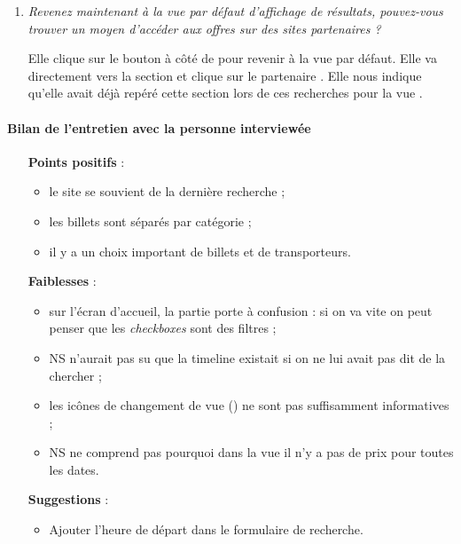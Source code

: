\begin{enumerate}
\item \textit{Revenez maintenant \`{a} la vue par d\'{e}faut d'affichage de r\'{e}sultats, pouvez-vous trouver un moyen d'acc\'{e}der aux offres sur des sites partenaires ?}

Elle clique sur le bouton \`{a} c\^{o}t\'{e} de  pour revenir \`{a} la vue par d\'{e}faut.
Elle va directement vers la section  et clique sur le partenaire .
Elle nous indique qu'elle avait d\'{e}j\`{a} rep\'{e}r\'{e} cette section lors de ces recherches pour la vue .


\end{enumerate}

\paragraph{Bilan de l'entretien avec la personne interview\'{e}e}

\begin{itemize}
  \item [\textbf{Points positifs}] :
      \begin{itemize}
      	\item le site se souvient de la derni\`{e}re recherche ;
        \item les billets sont s\'{e}par\'{e}s par cat\'{e}gorie ;
        \item il y a un choix important de billets et de transporteurs.
      \end{itemize}
      
  \item [\textbf{Faiblesses}] :
      \begin{itemize}
      	\item sur l'\'{e}cran d'accueil, la partie  porte \`{a} confusion : si on va vite on peut penser que les \textit{checkboxes} sont des filtres ;
      	\item NS n'aurait pas su que la timeline existait si on ne lui avait pas dit de la chercher ;
        \item les ic\^{o}nes de changement de vue () ne sont pas suffisamment informatives ;
        \item NS ne comprend pas pourquoi dans la vue  il n'y a pas de prix pour toutes les dates.
      \end{itemize}
      
  \item [\textbf{Suggestions}] :
      \begin{itemize}
      	\item Ajouter l'heure de d\'{e}part dans le formulaire de recherche.
      \end{itemize}
\end{itemize}




